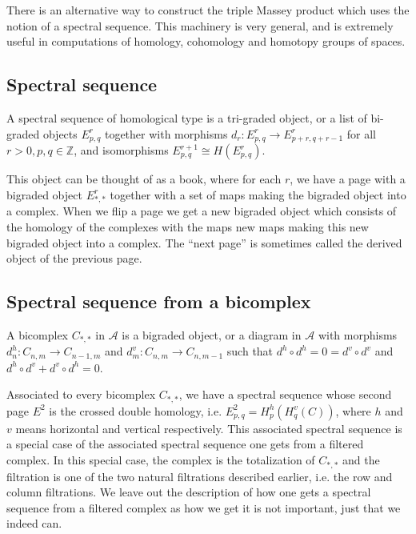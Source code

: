 
There is an alternative way to construct the triple Massey product which uses the notion of a spectral sequence. This machinery is very general, and is extremely useful in computations of homology, cohomology and homotopy groups of spaces. 


\subsection*{Spectral sequence}

\begin{definition}
A spectral sequence of homological type is a tri-graded object, or a list of bi-graded objects $E_{p,q}^r$ together with morphisms $d_r: E_{p,q}^r \longrightarrow E_{p+r, q+r-1}^r$ for all $r>0, p,q\in \mathbb{Z}$, and isomorphisms $E_{p,q}^{r+1}\cong H(E_{p,q}^{r})$. 
\end{definition}

This object can be thought of as a book, where for each $r$, we have a page with a bigraded object $E_{*,*}^r$ together with a set of maps making the bigraded object into a complex. When we flip a page we get a new bigraded object which consists of the homology of the complexes with the maps new maps making this new bigraded object into a complex. The ``next page'' is sometimes called the derived object of the previous page. 

\subsection*{Spectral sequence from a bicomplex}

\begin{definition}[Bicomplex]
A bicomplex $C_{*,*}$ in $\mathcal{A}$ is a bigraded object, or a diagram in $\mathcal{A}$ with morphisms 
$d^h_n: C_{n,m}\longrightarrow C_{n-1,m}$ and $d^v_m: C_{n,m}\longrightarrow C_{n,m-1}$ such that $d^h \circ d^h = 0 = d^v \circ d^v$ and $d^h \circ d^v + d^v \circ d^h = 0$.
\end{definition}

Associated to every bicomplex $C_{*,*}$, we have a spectral sequence whose second page $E^2$ is the crossed double homology, i.e. $E^2_{p,q}=H_p^{h}(H_q^{v}(C))$, where $h$ and $v$ means horizontal and vertical respectively. This associated spectral sequence is a special case of the associated spectral sequence one gets from a filtered complex. In this special case, the complex is the totalization of $C_{*,*}$ and the filtration is one of the two natural filtrations described earlier, i.e. the row and column filtrations. We leave out the description of how one gets a spectral sequence from a filtered complex as how we get it is not important, just that we indeed can.  

